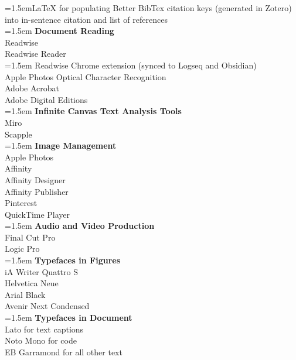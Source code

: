 \begin{multicols}{2}
\RaggedRight \hangindent=1.5emLaTeX for populating Better BibTex citation keys (generated in Zotero) into in-sentence citation and list of references \\
\vspace{4mm}
\noindent\hangindent=1.5em \textbf{Document Reading} \\
Readwise \\
Readwise Reader \\
\RaggedRight \hangindent=1.5em Readwise Chrome extension (synced to Logseq and Obsidian) \\
Apple Photos Optical Character Recognition \\
Adobe Acrobat \\
Adobe Digital Editions \\
\vspace{4mm}
\noindent\hangindent=1.5em \textbf{Infinite Canvas Text Analysis Tools} \\
Miro \\
Scapple \\
\vspace{4mm}
\noindent\hangindent=1.5em \textbf{Image Management} \\
Apple Photos \\
Affinity \\
Affinity Designer \\
Affinity Publisher \\
Pinterest \\
QuickTime Player \\
\vspace{4mm}
\noindent\hangindent=1.5em \textbf{Audio and Video Production} \\
\RaggedRight Final Cut Pro \\ 
\RaggedRight Logic Pro \\
\vspace{4mm}
\noindent\hangindent=1.5em \textbf{Typefaces in Figures} \\
iA Writer Quattro S \\
Helvetica Neue \\
Arial Black \\
Avenir Next Condensed \\
\vspace{4mm}
\noindent\hangindent=1.5em \textbf{Typefaces in Document} \\
Lato for text captions \\
Noto Mono for code \\
EB Garramond for all other text \\

\end{multicols}





